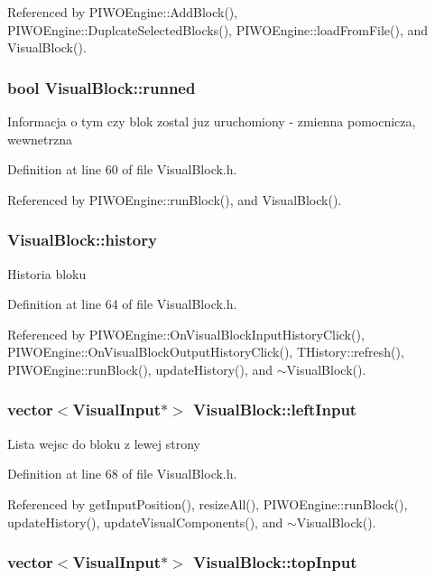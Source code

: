 Referenced by PIWOEngine::AddBlock(), PIWOEngine::DuplcateSelectedBlocks(), PIWOEngine::loadFromFile(), and VisualBlock().\hypertarget{classVisualBlock_3bc0c90322c4b39a85de000a2d036413}{
\subsubsection[runned]{\setlength{\rightskip}{0pt plus 5cm}bool {\bf VisualBlock::runned}}}
\label{classVisualBlock_3bc0c90322c4b39a85de000a2d036413}


Informacja o tym czy blok zostal juz uruchomiony - zmienna pomocnicza, wewnetrzna 

Definition at line 60 of file VisualBlock.h.

Referenced by PIWOEngine::runBlock(), and VisualBlock().\hypertarget{classVisualBlock_bae4197cd71315bf74e26e9e7f04bc8c}{
\subsubsection[history]{ {\bf VisualBlock::history}}}
\label{classVisualBlock_bae4197cd71315bf74e26e9e7f04bc8c}


Historia bloku 

Definition at line 64 of file VisualBlock.h.

Referenced by PIWOEngine::OnVisualBlockInputHistoryClick(), PIWOEngine::OnVisualBlockOutputHistoryClick(), THistory::refresh(), PIWOEngine::runBlock(), updateHistory(), and $\sim$VisualBlock().\hypertarget{classVisualBlock_8f4a1e25447f63dd82fef4ca1b5fa036}{
\subsubsection[leftInput]{\setlength{\rightskip}{0pt plus 5cm}vector$<${\bf VisualInput}$\ast$$>$ {\bf VisualBlock::leftInput}}}
\label{classVisualBlock_8f4a1e25447f63dd82fef4ca1b5fa036}


Lista wejsc do bloku z lewej strony 

Definition at line 68 of file VisualBlock.h.

Referenced by getInputPosition(), resizeAll(), PIWOEngine::runBlock(), updateHistory(), updateVisualComponents(), and $\sim$VisualBlock().\hypertarget{classVisualBlock_ea0803cef47e1cd7f3c3fd92268b2d5c}{
\subsubsection[topInput]{\setlength{\rightskip}{0pt plus 5cm}vector$<${\bf VisualInput}$\ast$$>$ {\bf VisualBlock::topInput}}}
\label{classVisualBlock_ea0803cef47e1cd7f3c3fd92268b2d5c}


